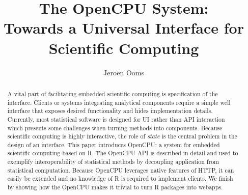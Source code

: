 \documentclass{article}
\author{Jeroen Ooms}
\title{The OpenCPU System:\\ Towards a Universal Interface for Scientific Computing}
\begin{document}
\maketitle

\begin{abstract}
A vital part of facilitating embedded scientific computing is specification of the interface. Clients or systems integrating analytical components require a simple well interface that exposes desired functionality and hides implementation details. Currently, most statistical software is designed for UI rather than API interaction which presents some challenges when turning methods into components. Because scientific computing is highly interactive, the role of \emph{state} is the central problem in the design of an interface. This paper introduces OpenCPU: a system for embedded scientific computing based on R. The OpenCPU API is described in detail and used to exemplify interoperability of statistical methods by decoupling application from statistical computation. Because OpenCPU leverages native features of HTTP, it can easily be extended and no knowledge of R is required to implement clients. We finish by showing how the OpenCPU makes it trivial to turn R packages into webapps.
\end{abstract}







 






\end{document}
